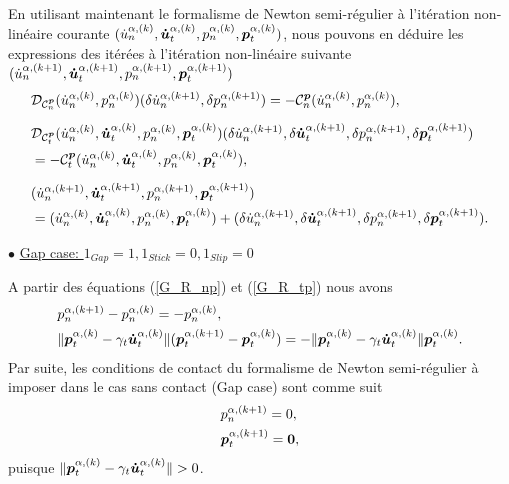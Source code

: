 En utilisant maintenant le formalisme de Newton semi-régulier à l'itération non-linéaire courante $(\dot{u}^{\alpha,(k)}_n,\boldsymbol{\dot{u}}^{\alpha,(k)}_t,p^{\alpha,(k)}_n,\boldsymbol{p}^{\alpha,(k)}_t)$, nous pouvons en déduire les expressions des itérées à l'itération non-linéaire suivante\\ $(\dot{u}^{\alpha,(k+1)}_n,\boldsymbol{\dot{u}}^{\alpha,(k+1)}_t,p^{\alpha,(k+1)}_n,\boldsymbol{p}^{\alpha,(k+1)}_t)$\\

\begin{align}
&{\cal D}_{{\cal C}_{n}^{\boldsymbol{p}}}(\dot{u}^{\alpha,(k)}_n,p^{\alpha,(k)}_n)(\delta \dot{u}^{\alpha,(k+1)}_n,\delta p^{\alpha,(k+1)}_n)= - {\cal C}_{n}^{\boldsymbol{p}} (\dot{u}^{\alpha,(k)}_n,p^{\alpha,(k)}_n),\label{G_R_np}\\[2mm]
&{\cal D}_{{\cal C}_{t}^{\boldsymbol{p}}}(\dot{u}^{\alpha,(k)}_n,\boldsymbol{\dot{u}}^{\alpha,(k)}_t,p^{\alpha,(k)}_n,\boldsymbol{p}^{\alpha,(k)}_t)(\delta \dot{u}^{\alpha,(k+1)}_n,\delta \boldsymbol{\dot{u}}^{\alpha,(k+1)}_t,\delta p^{\alpha,(k+1)}_n,\delta \boldsymbol{p}^{\alpha,(k+1)}_t)\label{G_R_tp}\\
&= - {\cal C}_{t}^{\boldsymbol{p}} (\dot{u}^{\alpha,(k)}_n,\boldsymbol{\dot{u}}^{\alpha,(k)}_t,p^{\alpha,(k)}_n,\boldsymbol{p}^{\alpha,(k)}_t)\nonumber,\\[2mm]
& (\dot{u}^{\alpha,(k+1)}_n,\boldsymbol{\dot{u}}^{\alpha,(k+1)}_t,p^{\alpha,(k+1)}_n,\boldsymbol{p}^{\alpha,(k+1)}_t)\label{3_2_27}\\
& =(\dot{u}^{\alpha,(k)}_n,\boldsymbol{\dot{u}}^{\alpha,(k)}_t,p^{\alpha,(k)}_n,\boldsymbol{p}^{\alpha,(k)}_t) +(\delta \dot{u}^{\alpha,(k+1)}_n,\delta \boldsymbol{\dot{u}}^{\alpha,(k+1)}_t,\delta p^{\alpha,(k+1)}_n,\delta \boldsymbol{p}^{\alpha,(k+1)}_t)\nonumber.
\end{align}

 $\bullet$ \underline{Gap case: ${1}_{Gap} =1, {1}_{Stick} = 0, {1}_{Slip} = 0$}

\noindent A partir des équations (\ref{G_R_np}) et (\ref{G_R_tp}) nous avons
\begin{align}
&p^{\alpha,(k+1)}_n-p^{\alpha,(k)}_n=-p^{\alpha,(k)}_n, \\
& \|\boldsymbol{p}^{\alpha,(k)}_t- \gamma_t \boldsymbol{\dot{u}}^{\alpha,(k)}_t\| (\boldsymbol{p}^{\alpha,(k+1)}_t-\boldsymbol{p}^{\alpha,(k)}_t) = -\|\boldsymbol{p}^{\alpha,(k)}_t- \gamma_t \boldsymbol{\dot{u}}^{\alpha,(k)}_t\|\boldsymbol{p}^{\alpha,(k)}_t.
\end{align}
Par suite, les conditions de contact du formalisme de Newton semi-régulier à imposer dans le cas sans contact (Gap case) sont comme suit
\begin{align}
&p^{\alpha,(k+1)}_n=0, \\
&\boldsymbol{p}^{\alpha,(k+1)}_t=\mbox{\boldmath{$0$}},
\end{align}
puisque $\|\vect{p}^{\alpha,(k)}_t- \gamma_t \vect{\dot{u}}^{\alpha,(k)}_t\|>0$.\\

